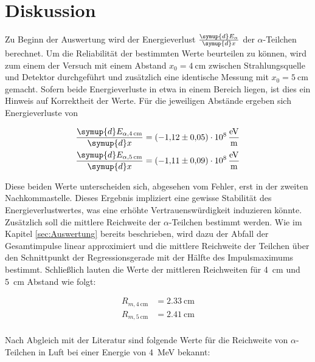 


\section{Diskussion}
\label{sec:Diskussion}

Zu Beginn der Auswertung wird der Energieverlust $\frac{\symup{d}E_\alpha}{\symup{d}x}$ der $\alpha$-Teilchen berechnet.
Um die Reliabilität der bestimmten Werte beurteilen zu können, wird zum einem der Versuch mit einem Abstand $x_0 = \qty{4}{\centi\meter}$
zwischen Strahlungsquelle und Detektor durchgeführt und zusätzlich eine identische Messung mit $x_0 = \qty{5}{\centi\meter}$ gemacht.
Sofern beide Energieverluste in etwa in einem Bereich liegen, ist dies ein Hinweis auf Korrektheit der Werte. Für die jeweiligen 
Abstände ergeben sich Energieverluste von 

\begin{align}
    \frac{\symup{d}E_{\alpha\text{,}\qty{4}{\centi \meter}}}{\symup{d}x} &= \qty{-1.12 \pm 0.05e8}{\eV\per\meter} \\
    \frac{\symup{d}E_{\alpha\text{,}\qty{5}{\centi \meter}}}{\symup{d}x} &= \qty{-1.11 \pm 0.09e8}{\eV\per\meter}
\end{align}

\noindent Diese beiden Werte unterscheiden sich, abgesehen vom Fehler, erst in der zweiten Nachkommastelle. Dieses Ergebnis 
impliziert eine gewisse Stabilität des Energieverlustwertes, was eine erhöhte Vertrauenswürdigkeit induzieren könnte.\\

\noindent Zusätzlich soll die mittlere Reichweite der $\alpha$-Teilchen bestimmt werden. Wie im Kapitel \ref{sec:Auswertung} bereits 
beschrieben, wird dazu der Abfall der Gesamtimpulse linear approximiert und die mittlere Reichweite der Teilchen über den 
Schnittpunkt der Regressionsgerade mit der Hälfte des Impulsmaximums bestimmt. Schließlich lauten die Werte der mittleren 
Reichweiten für \qty{4}{\centi\meter} und \qty{5}{\centi\meter} Abstand wie folgt:

\begin{align}
    R_{m, \qty{4}{\centi \meter}} &= \qty{2.33}{\centi \meter} \\
    R_{m, \qty{5}{\centi \meter}} &= \qty{2.41}{\centi \meter} \\
\end{align}

\noindent Nach Abgleich mit der Literatur\cite{Reichweite_Strahlung} sind folgende Werte für die Reichweite von $\alpha$-Teilchen 
in Luft bei einer Energie von \qty{4}{\mega\eV} bekannt:

